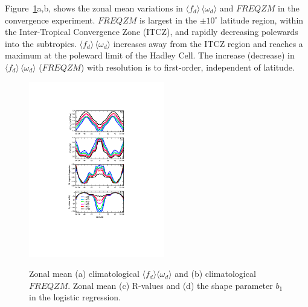 \documentclass[alpha-refs]{wiley-article}
\begin{document}
Figure~\ref{fig:4zonal}a,b, shows the zonal mean variations in $\langle f_{d} \rangle \, \langle \omega_{d} \rangle$ and $FREQZM$ in the convergence experiment. $FREQZM$ is largest in the $\pm 10^{\circ}$ latitude region, within the Inter-Tropical Convergence Zone (ITCZ), and rapidly decreasing polewards into the subtropics. $\langle f_{d} \rangle \, \langle \omega_{d} \rangle$ increases away from the ITCZ region and reaches a maximum at the poleward limit of the Hadley Cell. The increase (decrease) in $\langle f_{d} \rangle \, \langle \omega_{d} \rangle$ ($FREQZM$) with resolution is to first-order, independent of latitude.

\begin{figure}
\begin{center}
\noindent\includegraphics[width=14pc,angle=0]{figs/temp_4zonal.pdf}\\
\end{center}
\caption{Zonal mean (a) climatological $\langle f_{d} \rangle \langle \omega_{d} \rangle$ and (b) climatological $FREQZM$. Zonal mean (c) R-values and (d) the shape parameter $b_1$ in the logistic regression.}
\label{fig:4zonal}
\end{figure}
\end{document}

